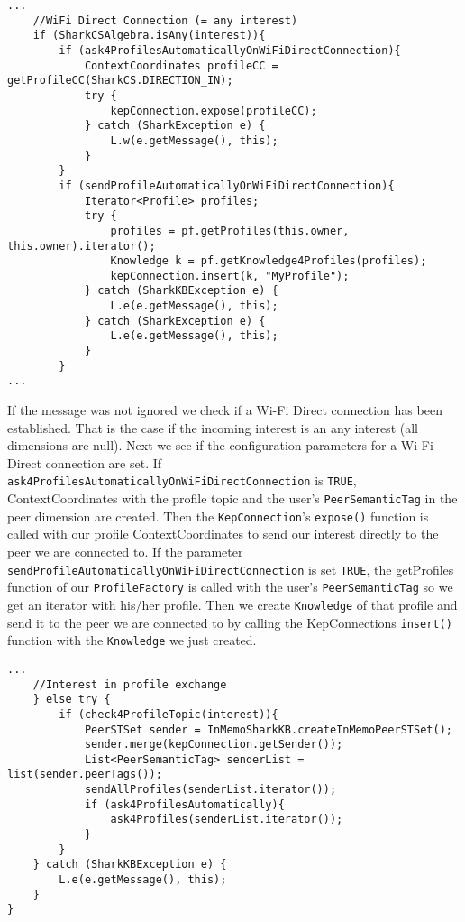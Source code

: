 \begin{verbatim}
...
    //WiFi Direct Connection (= any interest)
    if (SharkCSAlgebra.isAny(interest)){
        if (ask4ProfilesAutomaticallyOnWiFiDirectConnection){
            ContextCoordinates profileCC = getProfileCC(SharkCS.DIRECTION_IN);
            try {
                kepConnection.expose(profileCC);
            } catch (SharkException e) {
                L.w(e.getMessage(), this);
            }
        }
        if (sendProfileAutomaticallyOnWiFiDirectConnection){
            Iterator<Profile> profiles;
            try {
                profiles = pf.getProfiles(this.owner, this.owner).iterator();
                Knowledge k = pf.getKnowledge4Profiles(profiles);
                kepConnection.insert(k, "MyProfile");
            } catch (SharkKBException e) {
                L.e(e.getMessage(), this);
            } catch (SharkException e) {
                L.e(e.getMessage(), this);
            }
        }
...
\end{verbatim}

If the message was not ignored we check if a Wi-Fi Direct connection has been established. That is the case if the incoming interest is an any interest (all dimensions are null). Next we see if the configuration parameters for a Wi-Fi Direct connection are set. If  {\tt ask4ProfilesAutomaticallyOnWiFiDirectConnection} is {\tt TRUE}, ContextCoordinates with the profile topic and the user's {\tt PeerSemanticTag}  in the peer dimension are created. Then the {\tt KepConnection}'s {\tt expose()} function is called with our profile ContextCoordinates to send our interest directly to the peer we are connected to.
If the parameter {\tt sendProfileAutomaticallyOnWiFiDirectConnection} is set {\tt TRUE}, the getProfiles function of our {\tt ProfileFactory} is called with the user's {\tt PeerSemanticTag} so we get an iterator with his/her profile. Then we create {\tt Knowledge} of that profile and send it to the peer we are connected to by calling the KepConnections {\tt insert()} function with the {\tt Knowledge} we just created.

\begin{verbatim}
...
    //Interest in profile exchange
    } else try {
        if (check4ProfileTopic(interest)){
            PeerSTSet sender = InMemoSharkKB.createInMemoPeerSTSet();
            sender.merge(kepConnection.getSender());
            List<PeerSemanticTag> senderList = list(sender.peerTags());
            sendAllProfiles(senderList.iterator());
            if (ask4ProfilesAutomatically){
                ask4Profiles(senderList.iterator());
            }
        }
    } catch (SharkKBException e) {
        L.e(e.getMessage(), this);
    }
}
\end{verbatim}

